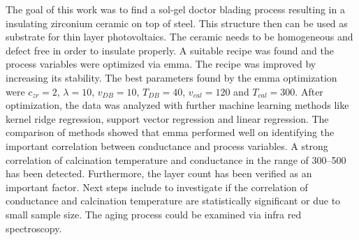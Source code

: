 The goal of this work was to find a sol-gel doctor blading process resulting in a insulating zirconium ceramic on top of steel.
This structure then can be used as substrate for thin layer photovoltaics. 
The ceramic needs to be homogeneous and defect free in order to insulate properly.
A suitable recipe was found\cite{Hu2016} and the process variables were optimized via \gls{emma}. 
The recipe was improved by increasing its stability. 
The best parameters found by the \gls{emma} optimization were 
$c_{zr}=2$, $\lambda=10$, $v_{DB}=10$, $T_{DB}=40$, $v_{cal}=120$ and $T_{cal}=300$.
After optimization, the data was analyzed with further machine learning methods like kernel ridge regression, support vector regression and linear regression. 
The comparison of methods showed that \gls{emma} performed well on identifying the important correlation between conductance and process variables. 
A strong correlation of calcination temperature and conductance in the range of 300--500\oc{} has been detected.
Furthermore, the layer count has been verified as an important factor. 
Next steps include to investigate if the correlation of conductance and calcination temperature are statistically significant or due to small sample size. 
The aging process could be examined via infra red spectroscopy. 
\iffalse
was kann noch veraendert werden? 
humidity 
solution age
vdb and tdb on g and phd 
Tcal on g and phd 

Making of the solution for the sol-gel process:
For a single concentrated solution \ml{0.05} of \gls{zrpro} are added while stirring to \ml{4.95} of \gls{buoh} and stirred for \minutes{15}. 
\ml{0.013} (or one molar equvilent of Zr) of \gls{acac} is added to the stirring solution. 
After another \minutes{15} \ml{1} of acetic acid is added and stirred for \minutes{30} to stabilize the solution up to \h{24}. 

The concentration can be increased up to 5 times being stable for a minimum of \h{4}. 
The sol-gel process produces am homogeneous transparent crystalline zirconia oxide layer. 
homogeneity can be mainly controlled via blade velocity and temperature and layers can be stacked.

It should have been also verglichen with grid search with comparable size
but most time was used to find a vernuenfig base recipe and process

It is still very human 
Der process is - as it the case with all ML and most fitting processes - is very abhaengig von hyper parameters, 
In the current work population size, number of generations, and most importantly boundaries (grenzen). 
\fi

